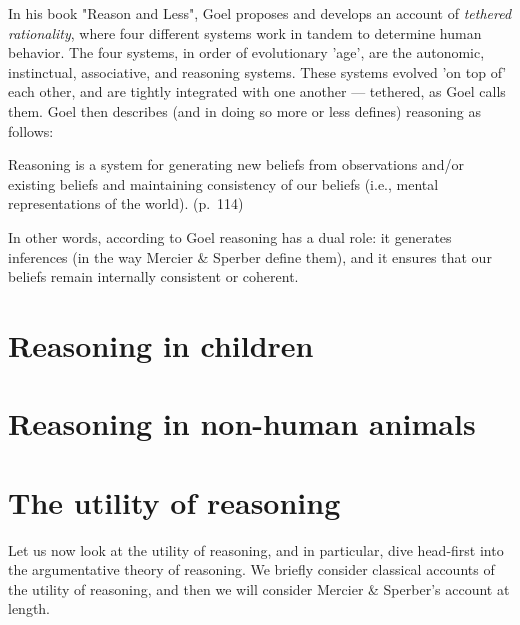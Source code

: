 In his \citeyear{Goel22} book "Reason and Less", Goel proposes and develops an account of \emph{tethered rationality}, where four different systems work in tandem to determine human behavior. The four systems, in order of evolutionary 'age', are the autonomic, instinctual, associative, and reasoning systems. These systems evolved 'on top of' each other, and are tightly integrated with one another --- tethered, as Goel calls them.
Goel then describes (and in doing so more or less defines) reasoning as follows:
\begin{quoting}
    Reasoning is a system for generating new beliefs from observations and/or existing beliefs and maintaining consistency of our beliefs (i.e., mental representations of the world).
    \hfill (p.~114)
\end{quoting}
In other words, according to Goel reasoning has a dual role: it generates inferences (in the way Mercier \& Sperber define them), and it ensures that our beliefs remain internally consistent or coherent.


\section{Reasoning in children}


\section{Reasoning in non-human animals}


\section{The utility of reasoning}

Let us now look at the utility of reasoning, and in particular, dive head-first into the argumentative theory of reasoning.
We briefly consider classical accounts of the utility of reasoning, and then we will consider Mercier \& Sperber's account at length.


